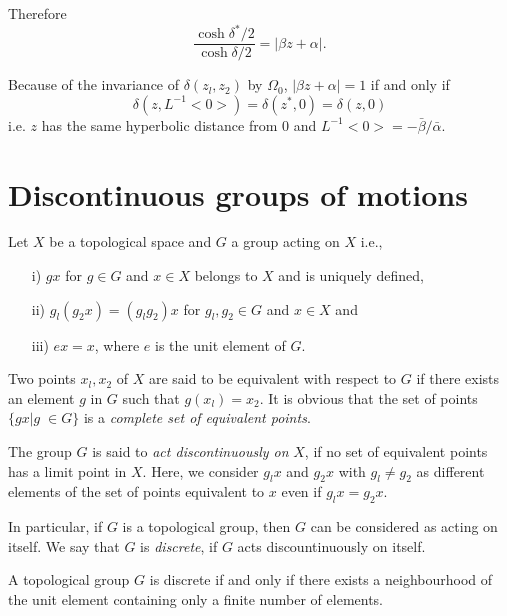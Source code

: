 Therefore \pageoriginale
$$
\frac{\cosh \delta^{\ast}/2}{\cosh \delta/2} = |\beta z + \alpha|.
$$

Because of the invariance of $\delta(z_l, z_2)$ by $\Omega_0$, $|\beta
z + \alpha|=1$ if and only if 
$$
\delta (z, L^{-1}<0>) = \delta (z^{\ast},0) = \delta (z,0)
$$
i.e. $z$ has the same hyperbolic distance from $0$ and $L^{-1}<0> =
-\bar{\beta}/\bar{\alpha}$.


\section{Discontinuous groups of motions}\label{chap1:sec2}%

Let $X$ be a topological space and $G$ a group acting on $X$ i.e., 
\begin{itemize}
\item[{\rm i)}] $gx$ for $g\in G$ and $x\in X$ belongs
  to $X$ and is uniquely defined, 

\item[{\rm ii)}] $g_l(g_2 x)=(g_lg_2)x$ for $g_l,g_2\in G$ and
  $x\in X$ and 

\item[{\rm iii)}] $ex=x$, where $e$ is the unit element of $G$.
\end{itemize}

\begin{defi*}
Two points $x_l, x_2$ of $X$ are said to be equivalent with respect to
$G$ if there exists an element $g$ in $G$ such that $g(x_l)=x_2$. It
is obvious that the set of points $\{gx |g \; \in G\}$ is a
\textit{complete set of equivalent points}.
\end{defi*}

\begin{defi*}
The group $G$ is said to \textit{act discontinuously on} $X$, if no
set of equivalent points has a limit point in $X$. Here, we consider
$g_lx$ and $g_2x$ with $g_l \neq g_2$ as different elements of the set
of points equivalent to $x$ even if $g_l x=g_2x$. 
\end{defi*}

In particular, if $G$ is a topological group, then $G$ can be
considered as acting on itself. We say that $G$ is \textit{discrete},
if $G$ acts discountinuously on itself.

\begin{lem}
A topological \pageoriginale group $G$ is discrete if and only if
there exists a 
neighbourhood of the unit element containing only a finite number of
elements. 
\end{lem}

